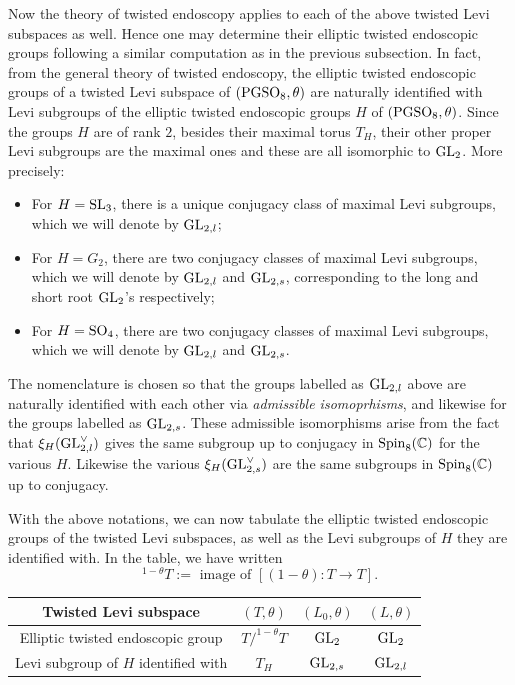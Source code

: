 \documentclass[11pt]{amsart}
\theoremstyle{plain}
\numberwithin{equation}{section}
\newcommand{\C}{\mathbb C}
\def\SL{{\rm SL}}
\def\PGSO{{\rm PGSO}}
\def\Spin{{\rm Spin}}
\def\Spin{{\rm Spin}}
\def\GL{{\rm GL}}
\def\SO{{\rm SO}}
\def\C{{\bf C}}
\def\C{{\mathbb C}}
\begin{document}
Now the theory of twisted endoscopy applies to each of the above twisted Levi subspaces as well. Hence one may determine their elliptic twisted endoscopic groups
following a similar computation as in the previous subsection. 
In fact, from the general theory of twisted endoscopy, the elliptic twisted endoscopic groups of a twisted Levi subspace of $(\PGSO_8, \theta)$ are naturally identified with Levi subgroups of  the elliptic twisted endoscopic groups $H$ of $(\PGSO_8, \theta)$. Since the groups $H$ are of rank $2$, besides their maximal torus $T_H$, their other proper Levi subgroups are the maximal ones and these are all  isomorphic to $\GL_2$. More precisely:

\vskip 5pt

\begin{itemize}
\item For $H = \SL_3$, there is a unique conjugacy class of maximal Levi subgroups, which we will denote by $\GL_{2,l}$;

\item For $H = G_2$, there are two conjugacy classes of maximal Levi subgroups, which we will denote by $\GL_{2,l}$ and $\GL_{2,s}$, corresponding to the long and short root $\GL_2$'s respectively;

\item For $H = \SO_4$, there are two conjugacy classes of maximal Levi subgroups, which we will denote by $\GL_{2,l}$ and $\GL_{2,s}$.
\end{itemize}
The nomenclature is chosen so that the groups labelled as $\GL_{2,l}$ above are naturally identified with each other via {\it admissible isomoprhisms},  and likewise for the groups labelled as $\GL_{2,s}$. 
These admissible isomorphisms  arise from the fact that $\xi_H(\GL_{2,l}^{\vee})$ gives the same  subgroup up to conjugacy in $\Spin_8(\C)$ for the various $H$. Likewise the various $\xi_H(\GL_{2,s}^{\vee})$ are the same subgroups in $\Spin_8(\C)$ up to conjugacy. 
\vskip 5pt

With the above notations, we can now tabulate the elliptic twisted endoscopic groups of the twisted Levi subspaces, as well as the Levi subgroups of $H$ they are identified with.
In the table, we have written
\[   {}^{1 - \theta}T := \text{ image of $[(1- \theta):T \rightarrow T]$.} \]
\vskip 5pt

\begin{center}
\begin{tabular}{|c|c|c|c|}
\hline 
Twisted Levi subspace &  $(T, \theta)$ & $(L_0,\theta)$ & $(L, \theta)$  \\
\hline  
Elliptic twisted endoscopic group &   $T / ^{1-\theta}T$  &  $\GL_2$ & $\GL_2$ \\
\hline 
Levi subgroup of $H$ identified with & $T_H$ & $\GL_{2,s}$    &  $\GL_{2,l}$   \\   
\hline
\end{tabular}
\end{center}
\end{document}
